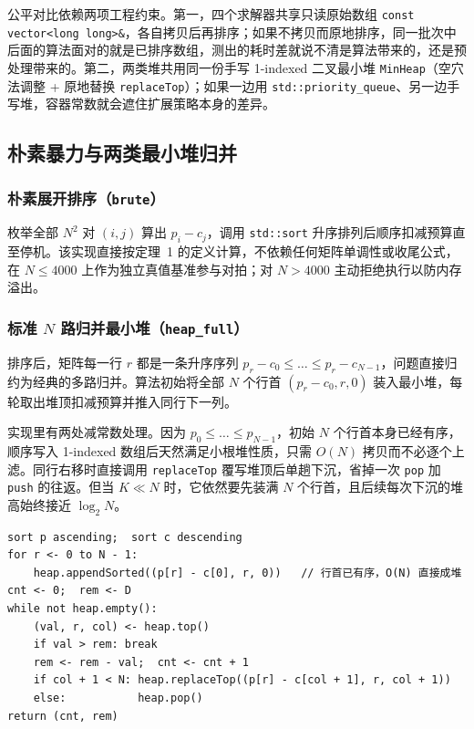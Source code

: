\documentclass[12pt,a4paper,fontset=windows]{ctexart}
\theoremstyle{plain}
\newcommand{\code}[1]{\texttt{#1}}
\begin{document}
公平对比依赖两项工程约束。第一，四个求解器共享只读原始数组 \code{const vector<long long>\&}，各自拷贝后再排序；如果不拷贝而原地排序，同一批次中后面的算法面对的就是已排序数组，测出的耗时差就说不清是算法带来的，还是预处理带来的。第二，两类堆共用同一份手写 1-indexed 二叉最小堆 \code{MinHeap}（空穴法调整 + 原地替换 \code{replaceTop}）；如果一边用 \code{std::priority\_queue}、另一边手写堆，容器常数就会遮住扩展策略本身的差异。

\subsection{朴素暴力与两类最小堆归并}

\subsubsection{朴素展开排序（\texorpdfstring{\code{brute}}{brute}）}

枚举全部 $N^2$ 对 $(i,j)$ 算出 $p_i - c_j$，调用 \code{std::sort} 升序排列后顺序扣减预算直至停机。该实现直接按定理~1 的定义计算，不依赖任何矩阵单调性或收尾公式，在 $N \le 4000$ 上作为独立真值基准参与对拍；对 $N > 4000$ 主动拒绝执行以防内存溢出。

\subsubsection{标准 \texorpdfstring{$N$}{N} 路归并最小堆（\texorpdfstring{\code{heap\_full}}{heap\_full}）}

排序后，矩阵每一行 $r$ 都是一条升序序列 $p_r - c_0 \le \dots \le p_r - c_{N-1}$，问题直接归约为经典的多路归并\cite{knuth1998}。算法初始将全部 $N$ 个行首 $(p_r - c_0, r, 0)$ 装入最小堆，每轮取出堆顶扣减预算并推入同行下一列。

实现里有两处减常数处理。因为 $p_0 \le \dots \le p_{N-1}$，初始 $N$ 个行首本身已经有序，顺序写入 1-indexed 数组后天然满足小根堆性质，只需 $O(N)$ 拷贝而不必逐个上滤。同行右移时直接调用 \code{replaceTop} 覆写堆顶后单趟下沉，省掉一次 \code{pop} 加 \code{push} 的往返。但当 $K \ll N$ 时，它依然要先装满 $N$ 个行首，且后续每次下沉的堆高始终接近 $\log_2 N$。

\begin{lstlisting}[float=htbp, title={算法 1：标准 $N$ 路归并最小堆（\code{heap\_full}）}]
sort p ascending;  sort c descending
for r <- 0 to N - 1:
    heap.appendSorted((p[r] - c[0], r, 0))   // 行首已有序，O(N) 直接成堆
cnt <- 0;  rem <- D
while not heap.empty():
    (val, r, col) <- heap.top()
    if val > rem: break
    rem <- rem - val;  cnt <- cnt + 1
    if col + 1 < N: heap.replaceTop((p[r] - c[col + 1], r, col + 1))
    else:           heap.pop()
return (cnt, rem)
\end{lstlisting}
\end{document}
